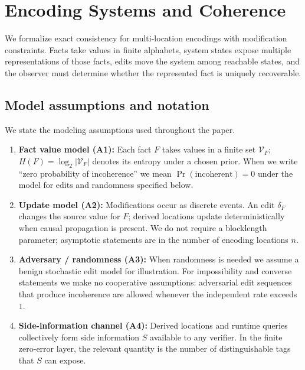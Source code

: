 \section{Encoding Systems and Coherence}\label{sec:foundations}

We formalize exact consistency for multi-location encodings with modification constraints. Facts take values in finite alphabets, system states expose multiple representations of those facts, edits move the system among reachable states, and the observer must determine whether the represented fact is uniquely recoverable.

\subsection{Model assumptions and notation}\label{sec:assumptions}

We state the modeling assumptions used throughout the paper.

\begin{enumerate}
\item \textbf{Fact value model (A1):} Each fact $F$ takes values in a finite set $\mathcal{V}_F$; $H(F)=\log_2|\mathcal{V}_F|$ denotes its entropy under a chosen prior. When we write ``zero probability of incoherence'' we mean $\Pr(\text{incoherent})=0$ under the model for edits and randomness specified below.
\item \textbf{Update model (A2):} Modifications occur as discrete events. An edit $\delta_F$ changes the source value for $F$; derived locations update deterministically when causal propagation is present. We do not require a blocklength parameter; asymptotic statements are in the number of encoding locations $n$.
\item \textbf{Adversary / randomness (A3):} When randomness is needed we assume a benign stochastic edit model for illustration. For impossibility and converse statements we make no cooperative assumptions: adversarial edit sequences that produce incoherence are allowed whenever the independent rate exceeds $1$.
\item \textbf{Side-information channel (A4):} Derived locations and runtime queries collectively form side information $S$ available to any verifier. In the finite zero-error layer, the relevant quantity is the number of distinguishable tags that $S$ can expose.
\end{enumerate}

